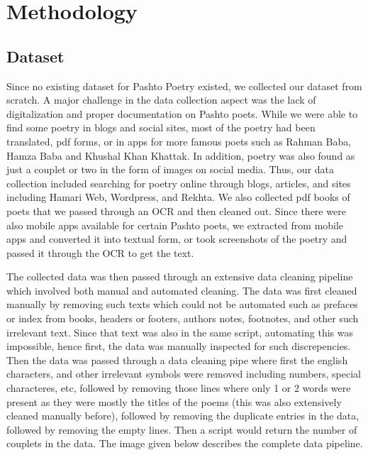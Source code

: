 \section{Methodology}

\subsection{Dataset}
Since no existing dataset for Pashto Poetry existed, we collected our dataset from scratch. A major challenge in the data collection aspect was the lack of digitalization and proper documentation on Pashto poets. While we were able to find some poetry in blogs and social sites, most of the poetry had been translated, pdf forms, or in apps for more famous poets such as Rahman Baba, Hamza Baba and Khushal Khan Khattak. In addition, poetry was also found as just a couplet or two in the form of images on social media. Thus, our data collection included searching for poetry online through blogs, articles, and sites including Hamari Web, Wordpress, and Rekhta. We also collected pdf books of poets that we passed through an OCR and then cleaned out. Since there were also mobile apps available for certain Pashto poets, we extracted from mobile apps and converted it into textual form, or took screenshots of the poetry and passed it through the OCR to get the text.

The collected data was then passed through an extensive data cleaning pipeline which involved both manual and automated cleaning. The data was first cleaned manually by removing such texts which could not be automated such as prefaces or index from books, headers or footers, authors notes, footnotes, and other such irrelevant text. Since that text was also in the same script, automating this was impossible, hence first, the data was manually inspected for such discrepencies. Then the data was passed through a data cleaning pipe where first the english characters, and other irrelevant symbols were removed including numbers, special characteres, etc, followed by removing those lines where only 1 or 2 words were present as they were mostly the titles of the poems (this was also extensively cleaned manually before), followed by removing the duplicate entries in the data, followed by removing the empty lines. Then a script would return the number of couplets in the data. The image given below describes the complete data pipeline. 

